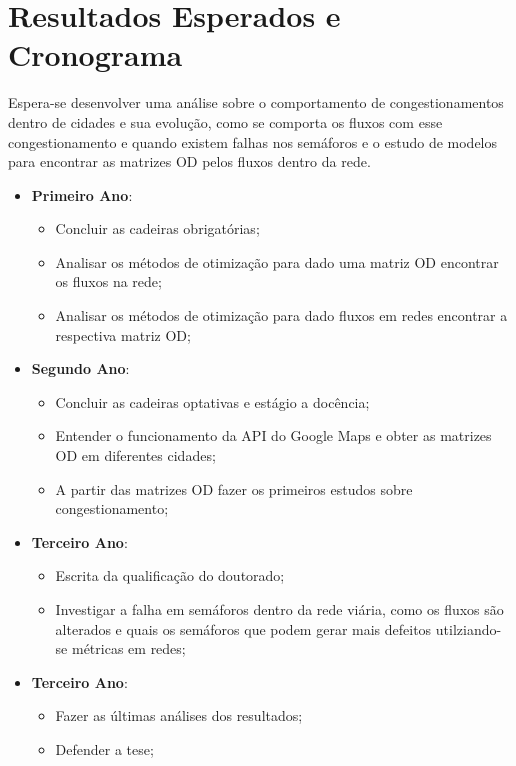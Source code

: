 \documentclass{article}
\begin{document}
\newpage

\section{Resultados Esperados e Cronograma}

Espera-se desenvolver uma análise sobre o comportamento de congestionamentos dentro de cidades e sua evolução, como se comporta os fluxos com esse congestionamento e quando existem falhas nos semáforos e o estudo de modelos para encontrar as matrizes OD pelos fluxos dentro da rede.

\begin{itemize}
    \item \textbf{Primeiro Ano}:
    \begin{itemize}
        \item Concluir as cadeiras obrigatórias;
        \item Analisar os métodos de otimização para dado uma matriz OD encontrar os fluxos na rede;
        \item Analisar os métodos de otimização para dado fluxos em redes encontrar a respectiva matriz OD;
    \end{itemize}
    \item \textbf{Segundo Ano}:
    \begin{itemize}
        \item Concluir as cadeiras optativas e estágio a docência;
        \item Entender o funcionamento da API do Google Maps e obter as matrizes OD em diferentes cidades;
        \item A partir das matrizes OD fazer os primeiros estudos sobre congestionamento;
    \end{itemize}
    \item \textbf{Terceiro Ano}:
    \begin{itemize}
        \item Escrita da qualificação do doutorado;
        \item Investigar a falha em semáforos dentro da rede viária, como os fluxos são alterados e quais os semáforos que podem gerar mais defeitos utilziando-se métricas em redes;
        
    \end{itemize}
    \item \textbf{Terceiro Ano}:
    \begin{itemize}
        \item Fazer as últimas análises dos resultados;
        \item Defender a tese;
    \end{itemize}
\end{itemize}


\newpage


\end{document}
